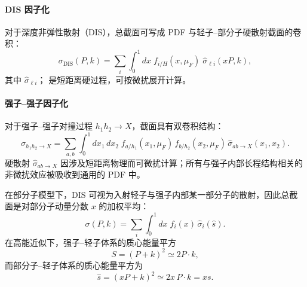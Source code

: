 \paragraph{DIS 因子化}
对于深度非弹性散射（DIS），总截面可写成 PDF 与轻子--部分子硬散射截面的卷积：
\begin{equation}
\sigma_{\mathrm{DIS}}(P,k)
= \sum_{i}\int_0^1 dx\; f_{i/H}(x,\mu_F)\;
\hat{\sigma}_{\ell i}(xP,k),
\end{equation}
其中 $\hat{\sigma}_{\ell i}$； 是短距离硬过程，可按微扰展开计算。
\paragraph{强子--强子因子化}
对于强子--强子对撞过程 $h_1 h_2\to X$，截面具有双卷积结构：
\begin{equation}
\sigma_{h_1 h_2\to X}
=\sum_{a,b}\int_0^1 dx_1\,dx_2\;
f_{a/h_1}(x_1,\mu_F)\,
f_{b/h_2}(x_2,\mu_F)\,
\hat{\sigma}_{ab\to X}(x_1,x_2).
\end{equation}
硬散射 $\hat{\sigma}_{ab\to X}$ 因涉及短距离物理而可微扰计算；所有与强子内部长程结构相关的非微扰效应被吸收到通用的 PDF 中。

在部分子模型下，DIS 可视为入射轻子与强子内部某一部分子的散射，因此总截面是对部分子动量分数 $x$ 的加权平均：
\begin{equation}
    \sigma(P,k)=\sum_i\int_0^1 dx\; f_i(x)\,\hat{\sigma}_i(\hat s).
\end{equation}
在高能近似下，强子--轻子体系的质心能量平方
\begin{equation}
    S=(P+k)^2\simeq 2P\cdot k,
\end{equation}
而部分子--轻子体系的质心能量平方为
\begin{equation}
    \hat s=(xP+k)^2\simeq 2x\,P\cdot k = x s.
\end{equation}

